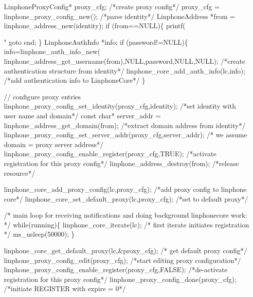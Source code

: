 \begin{DoxyCodeInclude}
{        LinphoneProxyConfig* proxy\_cfg;
        \textcolor{comment}{/*create proxy config*/}
        proxy\_cfg = linphone_proxy_config_new();
        \textcolor{comment}{/*parse identity*/}
        LinphoneAddress *from = linphone_address_new(identity);
        \textcolor{keywordflow}{if} (from==NULL)\{
                printf(\textcolor{stringliteral}{"%
                \textcolor{keywordflow}{goto} end;
        \}
                LinphoneAuthInfo *info;
                \textcolor{keywordflow}{if} (password!=NULL)\{
                        info=linphone_auth_info_new(
      linphone_address_get_username(from),NULL,password,NULL,NULL); \textcolor{comment}{/*create authentication structure from
       identity*/}
                        linphone_core_add_auth_info(lc,info); \textcolor{comment}{/*add authentication info to LinphoneCore*/}
                \}

                \textcolor{comment}{// configure proxy entries}
                linphone_proxy_config_set_identity(proxy\_cfg,identity); \textcolor{comment}{/*set identity with user name and
       domain*/}
                \textcolor{keyword}{const} \textcolor{keywordtype}{char}* server\_addr = linphone_address_get_domain(from); \textcolor{comment}{/*extract domain address from
       identity*/}
                linphone_proxy_config_set_server_addr(proxy\_cfg,server\_addr); \textcolor{comment}{/* we assume domain = proxy
       server address*/}
                linphone_proxy_config_enable_register(proxy\_cfg,TRUE); \textcolor{comment}{/*activate registration for this
       proxy config*/}
                linphone_address_destroy(from); \textcolor{comment}{/*release resource*/}

                linphone_core_add_proxy_config(lc,proxy\_cfg); \textcolor{comment}{/*add proxy config to linphone core*/}
                linphone_core_set_default_proxy(lc,proxy\_cfg); \textcolor{comment}{/*set to default proxy*/}


        \textcolor{comment}{/* main loop for receiving notifications and doing background linphonecore work: */}
        \textcolor{keywordflow}{while}(running)\{
                linphone_core_iterate(lc); \textcolor{comment}{/* first iterate initiates registration */}
                ms\_usleep(50000);
        \}

        linphone_core_get_default_proxy(lc,&proxy\_cfg); \textcolor{comment}{/* get default proxy config*/}
        linphone_proxy_config_edit(proxy\_cfg); \textcolor{comment}{/*start editing proxy configuration*/}
        linphone_proxy_config_enable_register(proxy\_cfg,FALSE); \textcolor{comment}{/*de-activate registration for this proxy
       config*/}
        linphone_proxy_config_done(proxy\_cfg); \textcolor{comment}{/*initiate REGISTER with expire = 0*/}

}}
\end{DoxyCodeInclude}
